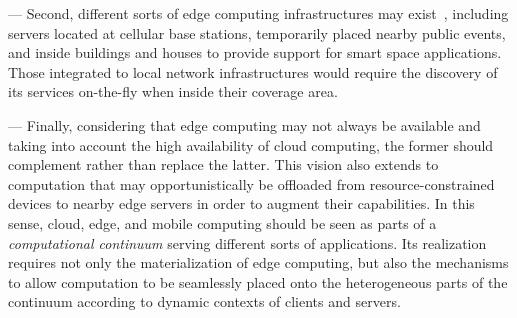 --- Second, different sorts of edge computing infrastructures may exist~\cite{1,2,Tarneberg2017}, including servers located at cellular base stations, temporarily placed nearby public events, and inside buildings and houses to provide support for smart space applications. Those integrated to local network infrastructures would require the discovery of its services on-the-fly when inside their coverage area.

--- Finally, considering that edge computing may not always be available and taking into account the high availability of cloud computing, the former should complement rather than replace the latter. This vision also extends to computation that may opportunistically be offloaded from resource-constrained devices to nearby edge servers in order to augment their capabilities. In this sense, cloud, edge, and mobile computing should be seen as parts of a \textit{computational continuum} serving different sorts of applications. Its realization requires not only the materialization of edge computing,
but also the mechanisms to allow computation to be seamlessly placed onto the heterogeneous parts of the continuum according to dynamic contexts of clients and servers. %

 


